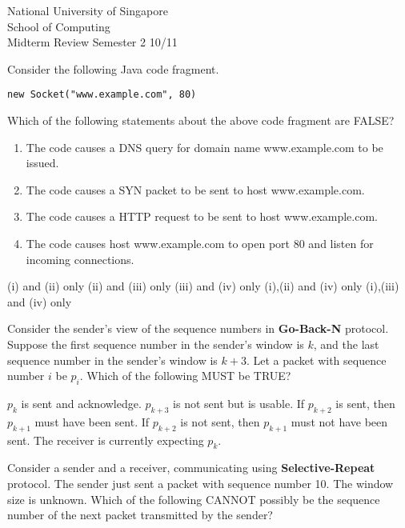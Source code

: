 \documentclass[a4paper,11pt]{exam}
\begin{document}
    \extraheadheight{.5in}
    {\large\sf National University of Singapore\\ School of Computing \\
    \LARGE\sf Midterm Review}%
    {\large\sf Semester 2 10/11}
    \firstpageheadrule
    \pagestyle{headandfoot}

\begin{questions}
\question
Consider the following Java code fragment.
\begin{verbatim}
new Socket("www.example.com", 80)
\end{verbatim}
Which of the following statements about the above code fragment are FALSE?
\renewcommand{\labelenumi}{(\roman{enumi})}
\begin{enumerate}
\item The code causes a DNS query for domain name www.example.com to be issued.
\item The code causes a SYN packet to be sent to host www.example.com.
\item The code causes a HTTP request to be sent to host www.example.com.
\item The code causes host www.example.com to open port 80 and listen for      
incoming connections.
\end{enumerate}

\begin{choices}
\choice (i) and (ii) only
\choice (ii) and (iii) only
\choice (iii) and (iv) only
\choice (i),(ii) and (iv) only
\choice (i),(iii) and (iv) only      
\end{choices}

\question
Consider the sender's view of the sequence numbers in \textbf{Go-Back-N}         protocol.
Suppose the first sequence number in the sender's window is $k$, and the last
sequence number in the sender's window is $k+3$.  Let a packet with sequence
number $i$ be $p_i$.  Which of the following MUST be TRUE?
\begin{choices}
\choice $p_k$ is sent and acknowledge.
\choice $p_{k+3}$ is not sent but is usable.
\choice If $p_{k+2}$ is sent, then $p_{k+1}$ must have been sent.
\choice If $p_{k+2}$ is not sent, then $p_{k+1}$ must not have been sent.
\choice The receiver is currently expecting $p_k$.
\end{choices}

\question
Consider a sender and a receiver, communicating using \textbf{Selective-Repeat}
protocol.  The sender just sent a packet with sequence number 10.  The window
size is unknown.  Which of the following CANNOT possibly be the sequence number
of the next packet transmitted by the sender?
\begin{choices}
\end{choices}


\end{questions}
\end{document}
